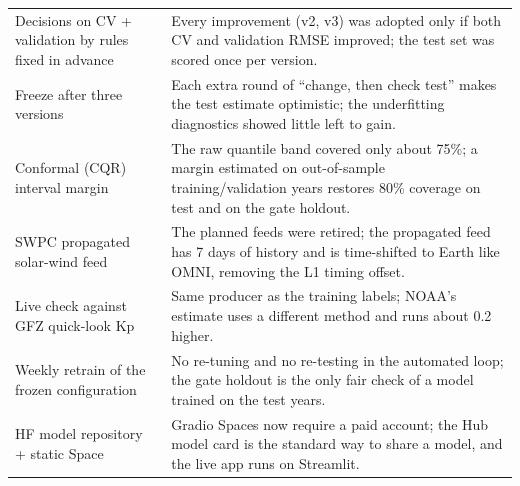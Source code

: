 \documentclass[11pt,a4paper]{article}
\begin{document}
\begin{longtable}{p{4.6cm}p{11.2cm}}
Decisions on CV + validation by rules fixed in advance & Every improvement (v2, v3) was adopted only if both CV and validation RMSE improved; the test set was scored once per version.\\
Freeze after three versions & Each extra round of ``change, then check test'' makes the test estimate optimistic; the underfitting diagnostics showed little left to gain.\\
Conformal (CQR) interval margin & The raw quantile band covered only about 75\%; a margin estimated on out-of-sample training/validation years restores 80\% coverage on test and on the gate holdout.\\
SWPC propagated solar-wind feed & The planned feeds were retired; the propagated feed has 7 days of history and is time-shifted to Earth like OMNI, removing the L1 timing offset.\\
Live check against GFZ quick-look Kp & Same producer as the training labels; NOAA's estimate uses a different method and runs about 0.2 higher.\\
Weekly retrain of the frozen configuration & No re-tuning and no re-testing in the automated loop; the gate holdout is the only fair check of a model trained on the test years.\\
HF model repository + static Space & Gradio Spaces now require a paid account; the Hub model card is the standard way to share a model, and the live app runs on Streamlit.\\
\bottomrule
\end{longtable}

\end{document}
